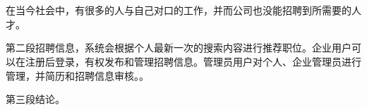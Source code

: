 



\clearpage
\chapter*{}


{\linespread{1.5} \selectfont 在当今社会中，有很多的人与自己对口的工作，并而公司也没能招聘到所需要的人才。
	
	第二段招聘信息，系统会根据个人最新一次的搜索内容进行推荐职位。企业用户可以在注册后登录，有权发布和管理招聘信息。管理员用户对个人、企业管理员进行管理，并简历和招聘信息审核。。
	
	第三段结论。\par} %



